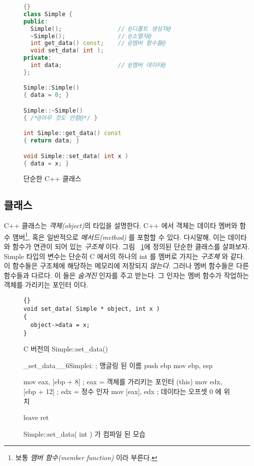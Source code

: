 \begin{figure}[t]
\begin{lstlisting}[language=C++,frame=tlrb,escapeinside=@@]{}
class Simple {
public:
  Simple();                // @디폴트 생성자@ 
  ~Simple();               // @소멸자@
  int get_data() const;    // @멤버 함수들@
  void set_data( int );
private:
  int data;                // @멤버 데이타@
};

Simple::Simple()
{ data = 0; }

Simple::~Simple()
{ /*@아무 것도 안함@*/ }

int Simple::get_data() const
{ return data; }

void Simple::set_data( int x )
{ data = x; }
\end{lstlisting}
\caption{단순한 C++ 클래스 \label{fig:SimpleClass}}
\end{figure}

\subsection{클래스}

C++ 클래스는 \emph{객체(object)}의 타입을 설명한다. C++ 에서 객체는 데이타 멤버와
함수 맴버\footnote{보통 \emph{맴버 함수(member function)} 이라 부른다.}, 혹은 일반적으로 
\emph{메서드(method)}  를 포함할 수 있다. 다시말해, 이는 데이타와 함수가
연관이 되어 있는 \emph{구조체} 이다. 그림 ~\ref{fig:SimpleClass}에 정의된 단순한 클래스를
살펴보자. {\code Simple} 타입의 변수는 단순히 C 에서의 하나의 {\code int} 를 멤버로 가지는 
\emph{구조체} 와 같다. 
 이 함수들은 구조체에 해당하는 메모리에 저장되지 \emph{않는다}.
그러나 멤버 함수들은 다른 함수들과 다르다. 이 들은 \emph{숨겨진} 인자를 주고 받는다. 그 인자는
멤버 함수가 작업하는 객체를 가리키는 포인터 이다. 

\begin{figure}[t]
\begin{lstlisting}[stepnumber=0]{}
void set_data( Simple * object, int x )
{
  object->data = x;
}
\end{lstlisting}
\caption{C 버전의 Simple::set\_data()\label{fig:SimpleCVer}}
\end{figure}


\begin{figure}[t]
\begin{AsmCodeListing}
_set_data__6Simplei:           ; 맹글링 된 이름 
      push   ebp
      mov    ebp, esp

      mov    eax, [ebp + 8]   ; eax = 객체를 가리키는 포인터 (this)
      mov    edx, [ebp + 12]  ; edx = 정수 인자 
      mov    [eax], edx       ; 데이타는 오프셋 0 에 위치 

      leave
      ret
\end{AsmCodeListing}
\caption{Simple::set\_data( int ) 가 컴파일 된 모습 \label{fig:SimpleAsm}}
\end{figure}

